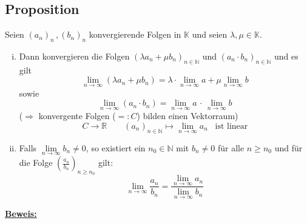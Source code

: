 \subsection{Proposition} %
\label{sub:proposition}
Seien $(a_n)_n \, , (b_n)_n$ konvergierende Folgen in $\mathds{K}$ und seien $\lambda, \mu \in \mathds{K}$.
\begin{enumerate}[(i)]
	\item Dann konvergieren die Folgen $(\lambda a_n + \mu b_n)_{n \in \mathds{N}}$ und $(a_n \cdot b_n)_{n \in \mathds{N}}$ und es gilt
	\[
		\lim\limits_{n \to \infty} (\lambda a_n + \mu b_n) = \lambda \cdot \lim\limits_{n \to \infty} a + \mu \lim\limits_{n \to \infty} b
	\]
	sowie
	\[
		\lim\limits_{n \to \infty} (a_n \cdot  b_n) = \lim\limits_{n \to \infty} a \, \cdot \, \lim\limits_{n \to \infty} b
	\]
	($\Rightarrow$ konvergente Folgen ($=: C$) bilden einen Vektorraum)
	\[
		C \to \mathds{R} \quad \quad (a_n)_{n \in \mathds{N}} 
		\mapsto \lim\limits_{n \to \infty} a_n \enspace \text{ ist linear}
	\]
	\item Falls $\lim\limits_{n \to \infty} b_n \not= 0$, so existiert ein $n_0 \in \mathds{N}$ 
	mit $b_n \not= 0$ für alle $n \geq n_0$ und für 
	die Folge $(\frac{a_n}{b_n})_{n \geq n_0}$ gilt:
	\[
		\lim\limits_{n \to \infty} \frac{a_n}{b_n} = \frac{\lim\limits_{n \to \infty} a_n}{\lim\limits_{n \to \infty} b_n}
	\]
\end{enumerate}
\underline{\textbf{Beweis:}}
